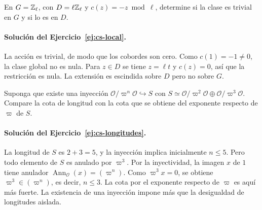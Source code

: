 \begin{ejercicio}\label{ej:cs-local}
En $G=\mathbb{Z}_\ell$, con $D=\ell\mathbb{Z}_\ell$ y
$c(z)=-z\bmod\ell$, determine si la clase
es trivial en $G$ y si lo es en $D$.
\end{ejercicio}

\paragraph{Solución del Ejercicio~\ref{ej:cs-local}.}
La acción es trivial, de modo que los cobordes
son cero. Como $c(1)=-1\ne0$, la clase global
no es nula. Para $z\in D$ se tiene $z=\ell t$
y $c(z)=0$, así que la restricción es nula.
La extensión es escindida sobre $D$ pero no
sobre $G$.

\begin{ejercicio}\label{ej:cs-longitudes}
Suponga que existe una inyección
$\mathcal O/\varpi^n\mathcal O\hookrightarrow
S$ con
$S\simeq\mathcal O/\varpi^2\mathcal O\oplus
\mathcal O/\varpi^3\mathcal O$.
Compare la cota de longitud con la cota que se
obtiene del exponente respecto de $\varpi$ de $S$.
\end{ejercicio}

\paragraph{Solución del Ejercicio~\ref{ej:cs-longitudes}.}
La longitud de $S$ es $2+3=5$, y la inyección
implica inicialmente $n\le5$. Pero todo elemento
de $S$ es anulado por $\varpi^3$. Por la inyectividad,
la imagen $x$ de $1$ tiene anulador
$\operatorname{Ann}_{\mathcal O}(x)=(\varpi^n)$.
Como $\varpi^3x=0$, se obtiene
$\varpi^3\in(\varpi^n)$, es decir, $n\le3$.
La cota por el exponente respecto de $\varpi$ es aquí más fuerte.
La existencia de una inyección impone más que
la desigualdad de longitudes aislada.

